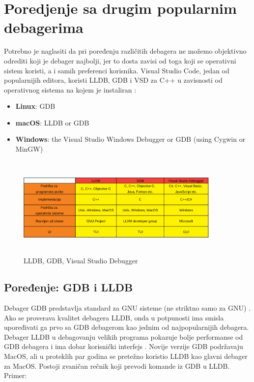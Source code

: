 \documentclass[a4paper]{article}
\begin{document}
\section{Poredjenje sa drugim popularnim debagerima}
\label{sec:naslovN}

Potrebno je naglasiti da pri poređenju različitih debagera ne možemo objektivno odrediti koji je debager najbolji, jer to dosta zavisi od toga koji se operativni sistem koristi, a i samih preferenci korisnika. Visual Studio Code, jedan od popularnijih editora, koristi LLDB, GDB i VSD za C++ u zavisnosti od operativnog sistema na kojem je instaliran \cite{vsc_support}:
\begin{itemize}
	\item \textbf{Linux}: GDB
	\item \textbf{macOS}: LLDB or GDB
	\item \textbf{Windows}: the Visual Studio Windows Debugger or GDB (using Cygwin or MinGW)
\end{itemize}

\begin{figure}[h!]
	\begin{center}
		\includegraphics[width=100mm,height=50mm]{Slike/tabela_poredjenje1.png}
	\end{center}
	\caption{LLDB, GDB, Visual Studio Debugger \cite{gdb}\cite{lldb}\cite{vsd}}
	\label{fig:tabela_poredjenje1}
\end{figure}

\subsection{Poređenje: GDB i LLDB}
\label{subsec: GDB i LLDB}

Debager GDB predstavlja standard za GNU sisteme (ne striktno samo za GNU) \cite{gdb}. Ako se proverava kvalitet debagera LLDB, onda u potpunosti ima smisla upoređivati ga prvo sa GDB debagerom kao jednim od najpopularnijih debagera. Debager LLDB u debagovanju velikih programa pokazuje bolje performanse od GDB debagera i ima dobar korisnički interfejs \cite{lldb_project_blog}. Novije verzije GDB podržavaju MacOS, ali u proteklih par godina se pretežno koristio LLDB kao glavni debager za MacOS. Postoji zvaničan rečnik koji prevodi komande iz GDB u LLDB. \cite {lldb_to_gdb_map} Primer:
\end{document}
